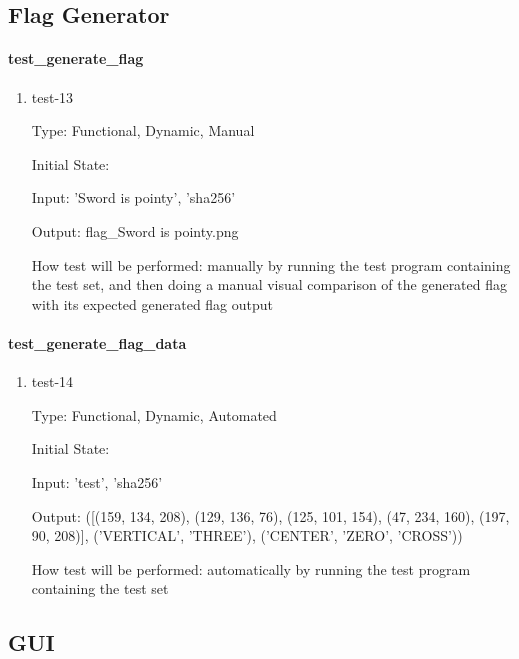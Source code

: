 \documentclass[12pt, titlepage]{article}
\begin{document}
\subsection{Flag Generator}

\paragraph{test\_generate\_flag}

\begin{enumerate}

\item{test-13\\}

Type: Functional, Dynamic, Manual

Initial State:

Input: 'Sword is pointy', 'sha256'

Output: flag\_Sword is pointy.png

How test will be performed: manually by running the test program containing
the test set, and then doing a manual visual comparison of the generated flag
with its expected generated flag output

\end{enumerate}

\paragraph{test\_generate\_flag\_data}

\begin{enumerate}

\item{test-14\\}

Type: Functional, Dynamic, Automated

Initial State:

Input: 'test', 'sha256'

Output: ([(159, 134, 208), (129, 136, 76), (125, 101, 154), (47, 234, 160),
(197, 90, 208)], ('VERTICAL', 'THREE'), ('CENTER', 'ZERO', 'CROSS'))

How test will be performed: automatically by running the test program
containing the test set

\end{enumerate}

\subsection{GUI}
\end{document}
